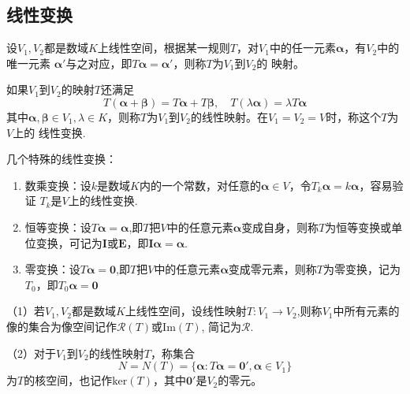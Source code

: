 \subsection{线性变换}
    \begin{definition}[线性变换]
        设$V_1,V_2$都是数域$K$上线性空间，根据某一规则$T$，对$V_1$中的任一元素$\boldsymbol{\alpha}$，有$V_2$中的唯一元素
        $\boldsymbol{\alpha}'$与之对应，即$T\boldsymbol{\alpha}=\boldsymbol{\alpha}'$，则称$T$为$V_1$到$V_2$的
        {\heiti 映射}。

        如果$V_1$到$V_2$的映射$T$还满足
        $$T(\boldsymbol{\alpha}+\boldsymbol{\beta})=T\boldsymbol{\alpha}+T\boldsymbol{\beta},\quad T(\lambda\boldsymbol{\alpha})=\lambda T\boldsymbol{\alpha}$$
        其中$\boldsymbol{\alpha},\boldsymbol{\beta}\in V_1,\lambda\in K$，则称$T$为$V_1$到$V_2$的{\heiti 线性映射}。在$V_1=V_2=V$时，称这个$T$为$V$上的
        {\heiti 线性变换}.
    \end{definition}

    \begin{definition}
        几个特殊的线性变换：
        \begin{enumerate}[(1)]
            \item {\heiti 数乘变换：}设$k$是数域$K$内的一个常数，对任意的$\boldsymbol{\alpha}\in V$，令$T_k\boldsymbol{\alpha}=k\boldsymbol{\alpha}$，容易验证
            $T_k$是$V$上的线性变换.
            \item {\heiti 恒等变换：}设$T\boldsymbol{\alpha}=\boldsymbol{\alpha}$,即$T$把$V$中的任意元素$\boldsymbol{\alpha}$变成自身，则称$T$为{\heiti 恒等变换}或{\heiti 单位变换}，可记为$\boldsymbol{I}$或$\boldsymbol{E}$，即$\boldsymbol{I}\boldsymbol{\alpha}=\boldsymbol{\alpha}$.
            \item {\heiti 零变换：}设$T\boldsymbol{\alpha}=\boldsymbol{0}$,即$T$把$V$中的任意元素$\boldsymbol{\alpha}$变成零元素，则称$T$为零变换，记为$T_0$，即$T_0\boldsymbol{\alpha}=\boldsymbol{0}$
        \end{enumerate}
    \end{definition}

    \begin{definition}[像空间与核空间]
        （1）若$V_1,V_2$都是数域$K$上线性空间，设线性映射$T:V_1\to V_2$,则称$V_1$中所有元素的像的集合为{\heiti 像空间}记作$\mathcal{R} (T)$或$\mathrm{Im}(T)$, 简记为$\mathcal{R}$.
        
        （2）对于$V_1$到$V_2$的线性映射$T$，称集合
        $$N=N(T)=\{\boldsymbol{\alpha}:T\boldsymbol{\alpha}=\boldsymbol{0}',\boldsymbol{\alpha}\in V_1\}$$
        为$T$的{\heiti 核空间}，也记作$\mathrm{ker}(T)$，其中$\boldsymbol{0}'$是$V_2$的零元。
    \end{definition}

